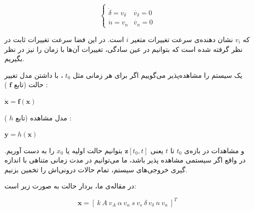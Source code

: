 \documentclass[11pt, fleqn]{article}
\begin{document}
\begin{multicols}{2}
\begin{LTR}
\begin{equation}
\begin{cases}
\\

\dot{\delta} = v_\delta & \dot{v_\delta} = 0  

\\

\dot{n} = v_n & \dot{v_n} = 0  

\end{cases}
\end{equation}
\end{LTR}


که 
$v_i$
 نشان دهنده‌ی سرعت تغییرات متغیر $i$
 است. در این فضا سرعت تغییرات ثابت در نظر گرفته شده است که بتوانیم در عین سادگی، تغییرات آن‌ها با زمان را نیز در نظر بگیریم. 































	یک سیستم را مشاهده‌پذیر می‌گوییم اگر برای هر زمانی مثل 
$t_0$
،
	 با داشتن مدل تغییر حالت
(تابع 
$\mathbf{f}$
)
:

\begin{latin}
$\mathbf{\dot{x}} = \mathbf{f}(\mathbf{x})$
\end{latin}

 مدل مشاهده
(تابع 
$h$
)
:

\begin{latin}
$\mathbf{y} = h(\mathbf{x})$
\end{latin}

و مشاهدات در بازه‌ی 
$t_0$
 تا 
 $t$
  یعنی
$\mathbf{z}[t_0, t]$
 بتوانیم حالت اولیه یا 
 $x_0$
 را به دست آوریم. در واقع اگر سیستمی مشاهده‌ پذیر باشد، ما می‌توانیم در مدت زمانی متناهی با اندازه گیری خروجی‌های سیستم، تمام حالات درونی‌اش را تخمین بزنیم.  
 
	در مقاله‌ی ما، بردار حالت به صورت زیر است:

\useshortskip
\begin{LTR}
\begin{equation}
\mathbf{x} = [\ k \ A \ v_A \  \alpha \  v_\alpha \  s \ v_s  \ \delta \  v_\delta \ n \  v_n \ ]^T
\end{equation} 
\end{LTR}


\end{multicols}
\end{document}
